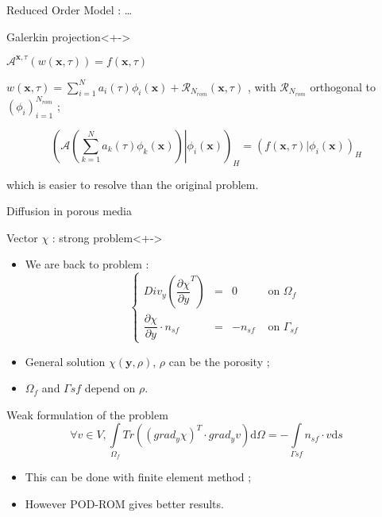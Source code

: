 \begin{frame}{Reduced Order Model : \dots}
\begin{block}{Galerkin projection}<+->
%
\begin{description}
\item<+-> [For a given problem] $\mathcal{A}^{\mathbf{x},\tau}\left(w(\mathbf{x},\tau)\right)=f(\mathbf{x},\tau)$
\item<+-> [Decomposition] $w(\mathbf{x},\tau)=\sum\limits_{i=1}^N a_i(\tau)\phi_i(\mathbf{x})+\mathcal{R}_{N_{rom}}(\mathbf{x},\tau)$ , with $\mathcal{R}_{N_{rom}}$ orthogonal to $(\phi_i)_{i=1}^{N_{rom}}$ ;
\item<+-> [The problem in $a_k$] %
\[%
\left(\left.\mathcal{A}\left(\sum\limits_{k=1}^N a_k(\tau)\phi_k(\mathbf{x})\right) \right|\phi_i\left(\mathbf{x}\right)\right)_H %
= \left(f\left(\mathbf{x},\tau\right)|\phi_i(\mathbf{x})\right)_H%
\]
\item<+-> [\dots] which is easier to resolve than the original problem.
\end{description}
%
\end{block}
%
\end{frame}

\begin{frame}{Diffusion in porous media}
%
\begin{block}{Vector $\chi$ : strong problem}<+->
\begin{itemize}
\item<+-> We are back to problem :
\[%
\left\{%
\begin{array}{lccr}
Div_y \left( \dfrac{\partial{\chi}}{\partial{y}}^T\right) &=& 0&\text{ on }\Omega_f \\
\dfrac{\partial{\chi}}{\partial{y}} \cdot n_{sf}&=&-n_{sf}&\text{ on }\Gamma_{sf}
\end{array}
\right.
\]
\item<+-> General solution $\chi(\mathbf{y},\rho)$, $\rho$ can be the porosity ;
\item<+-> $\Omega_f$ and $\Gamma{sf}$ depend on $\rho$.
\end{itemize}
\end{block}
%
\end{frame}

\begin{frame}{Weak formulation of the problem}
%
\[%
\forall v \in V , %
\int\limits_{\Omega_f}Tr\left(\left(grad_y\chi\right)^T\cdot grad_y v\right)\text{d}\Omega=%
-\int\limits_{\Gamma{sf}}n_{sf}\cdot v\text{d}s%
\]

\pause
\begin{itemize}
\item<+-> This can be done with finite element method ;
\item<+-> However POD-ROM gives better results.
\end{itemize}
%
\end{frame}

